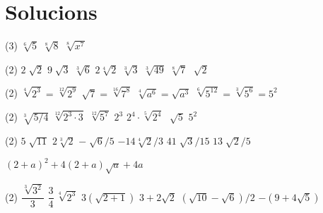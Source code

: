 \documentclass[11pt, a4paper, pdf]{article}
\let\frac\dfrac
\begin{document}
\section*{Solucions}
\setcounter{myenumi}{0}
\begin{multicols}{2}
\begin{mylist}
	\item
	\begin{tasks}(3)
		\task $\sqrt[{6}]{5} $  \task  $\sqrt[{8}]{8} $  \task  $\sqrt[{8}]{x^{7} } $
	\end{tasks}
	
	\item
	\begin{tasks}(2)
		\task  $2\sqrt[{}]{2} $    \task  $9\sqrt[{}]{3} $    \task  $\sqrt[{3}]{6} $   \task  $2\sqrt[{4}]{2} $   \task $\sqrt[{3}]{3} $    \task  $\sqrt[{3}]{49} $       \task  $\sqrt[{8}]{7} $    \task  $\sqrt[{}]{2} $
	\end{tasks}
	
	\item
	\begin{tasks}(2)
		\task  $\sqrt[{4}]{2^{3} } =\sqrt[{12}]{2^{9} } $      \task  $\sqrt{7} =\sqrt[{16}]{7^{8} } $    \task  $\sqrt[{4}]{a^{6} } =\sqrt{a^{3} } $      \task  $\sqrt[{6}]{5^{12} } =\sqrt[{3}]{5^{6} } =5^{2} $
	\end{tasks}
	
			
	\item
	\begin{tasks}(2)
		\task  $\sqrt[{3}]{5/4} $       \task  $\sqrt[{12}]{2^{3} \cdot 3} $    \task  $\sqrt[{12}]{5^{7} } $     \task  $2^{3} $      \task  $2^{4} \cdot \sqrt[{5}]{2^{4} } $     \task  $\sqrt[{}]{5} $            \task  $5^{2} $
	\end{tasks}
	
	\item
	\begin{tasks}(2)
		\task  $5\sqrt[{}]{11} $  \task  $2\sqrt[{3}]{2} $     \task  $-\sqrt[{}]{6} /5$     \task  $-14\sqrt[{4}]{2} /3$      \task  $41\sqrt[{}]{3} /15$    \task  $13\sqrt[{}]{2} /5$
	\end{tasks}

		
	\item $(2+a)^{2} +4(2+a)\sqrt{a} +4a$

	
		
	\item
	\begin{tasks}(2)
		\task  $\frac{\sqrt[{3}]{3^{2} } }{3} $ \task  $\frac{3}{4} \, \sqrt[{4}]{2^{3} } $ \task  $3(\sqrt{2+1} )$ \task  $3+2\sqrt{2} $  \task  $(\sqrt{10} -\sqrt{6} )/2$   \task  $-(9+4\sqrt{5} )$
	\end{tasks}
	

\end{mylist}
\end{multicols}
\end{document}
